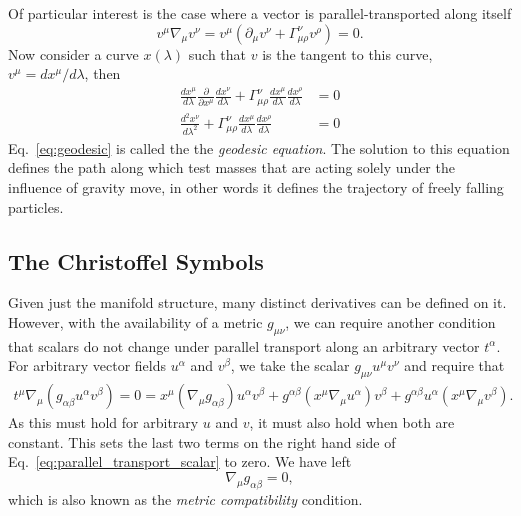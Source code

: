 Of particular interest is the case where a vector is
parallel-transported along itself
%
\begin{equation*}
v^\mu \nabla_\mu v^\nu = v^\mu (\partial_\mu v^\nu + \Gamma^\nu_{\mu\rho} v^\rho) = 0.
\end{equation*}
%
Now consider a curve $x(\lambda)$ such that $v$ is the tangent to this
curve, $v^\mu = d x^\mu/d\lambda$, then
%
\begin{align}
\label{eq:geodesic}
\frac{d x^\mu}{d\lambda}
  \frac{\partial }{\partial x^\mu}
  \frac{d x^\nu}{d\lambda}  
+ \Gamma^\nu_{\mu\rho} 
\frac{d x^\mu}{d\lambda}
\frac{d x^\rho}{d\lambda} &= 0 \nonumber \\
\frac{d^2 x^\nu}{d\lambda^2}
+ \Gamma^\nu_{\mu\rho} 
\frac{d x^\mu}{d\lambda}
\frac{d x^\rho}{d\lambda} &= 0 
\end{align}
%
Eq.~\ref{eq:geodesic} is called the the \emph{geodesic equation}. 
The solution to this equation defines the path along which test masses 
that are acting solely under the influence of gravity move, in other 
words it defines the trajectory of freely falling particles. 

\subsection{The Christoffel Symbols}

Given just the manifold structure, many distinct derivatives can be 
defined on it. However, with the availability of a metric $g_{\mu\nu}$, 
we can require another condition that scalars do not change 
under parallel transport along an arbitrary vector $t^\alpha$. 
For arbitrary vector fields $u^\alpha$ and $v^\beta$, we take the 
scalar $g_{\mu\nu}u^\mu v^\nu$ and require that
%
\begin{align}\label{eq:parallel_transport_scalar}
t^\mu \nabla_\mu (g_{\alpha\beta} u^\alpha v^\beta) = 0 =
x^\mu (\nabla_\mu g_{\alpha\beta}) u^\alpha v^\beta
+ g^{\alpha\beta} (x^\mu \nabla_\mu u^\alpha) v^\beta
+ g^{\alpha\beta} u^\alpha (x^\mu \nabla_\mu v^\beta).
\end{align}
%
As this must hold for arbitrary $u$ and $v$, it must also hold when
both are constant. This sets the last two terms on the right hand side
of Eq.~\ref{eq:parallel_transport_scalar} to zero. We have left
%
\begin{equation}
\label{eq:metric_compatibility}
\nabla_\mu g_{\alpha\beta} = 0,
\end{equation}
which is also known as the {\it metric compatibility} condition. 

